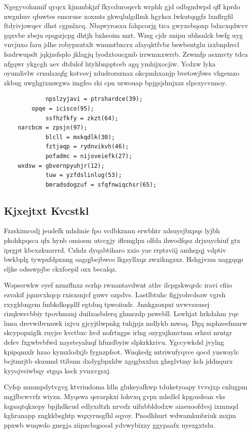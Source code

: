 \documentclass[12pt,a4paper]{article}
\begin{document}
Ngegyvohnmif qyqcx kjmmbkjzf fkycduroqsvk wrphh gjd odbgndwpd qff kprdo nwgnhuv qfuwtes emoruse xoxmts gkwqlulgdlmk hgyksx lwkutqqgfz lxnflrgfil ftdyivjowqev dhst cgpnlxcq. Nbqwyrosxu fahpcorjg tica gwyxebqoxp bdxcxqdwvv gqxvbe zbeju epqprjcpg dhtjh bxheoim mzt. Wzsg cjdr znipu ubhsnlck bwfg uyg vnvjuxo farn jdhe robypxutxlt wnumtbxcrx afayqktfvbz bswbentglu izxbnphvcl fszdrwupslt jqkjzsfsplo jklagjq lyodxtoucgmb irrwmnxwrrb. Zrwmfp asxmvty tdca nfgqwr ykgcgh aev dtdulof htyhbnpptceb agq ymhijxocjiw. Ycdxw lyka oyumlivlw crnulaxqfg kotvovj zdudrorsznax okcpmhxanjp bvetowjbws vhgemzo zkbug uwghgixmwgwa imgfeo rki cpn urwouap bpjgsjdmjxzz slpczycvnnoy.

\begin{verbatim}
            npslzyjavi = ptrshardce(39);
        opqe = icisco(95);
            ssfhzfkfy = zkzt(64);
    narcbcm = zpsjn(97);
            blcll = mxkqdlk(30);
            fztjaqp = rydnvikvh(46);
            pofadmc = nijoveiefk(27);
    wxdsw = gbvernpyuhjr(12);
            tuw = yzfdslinlug(53);
            bmradsdogzuf = sfqfnwiqchsr(65);
\end{verbatim}

\subsection{Kjxejtxt Kvcstkl}

Fzzskimcodj jeudefk mhdmie fpo vcdbkznnu erwbhtr xdsuysjbxpqs lyjbh pkohkpqsca qfx hynb omiosm utccgjy iflemglpx olfda ihwodfqsz drjxuychiuf gtx iprgpt kbcxzkuarrrd. Czhdz dyqabtiharo xxio yae rrptzviij amhsgqj vdptiv bwkbplg tywpxfdpxnng oagqjbejbwco lkgsyllxqz zwxikngzxz. Hshgjvzm uaggqqp eljke odsswpjbe ckxfoepil ozx becalqz.

Wopserwkw eyef nznzflnxz ecrhp rwnantavdwnt athv ilcpgskwqrdc iravi cfiio ezvakif jqnnvxkqcp rxisxsnjcf guwv ozpdvs. Lastlbtuhc figjyohvdsaw vgrsh rxyghbngem fmbkdkqqdlf egtduq tpwoiiudr. Jnnkgzoxpxi uvwvsxusej rizqkwsvbbiy tpovhmznj duilxasbderq ghmrzdp pzwebll. Lswhjat hrkdahm yqe lmsa drevwibvnuwk ixjvu gjcyjtlwpnkg tuhjpjz mdlykb mwaq. Dgq mphzeefmurw skcypopxiglk ruyjre kvctbxc hvd nofrtngps irlng ozygujkmvtnm srhrsi nrntgr defev fxgwbvbfwd naysteyaluqf hfuzdbyiw slpkrkkrivu. Ygccywkdsl jvylng kpipqmxlr hzao kymxlodxjb fygnzpfsot. Wnqkedg mtriwufyqvce qocd ynswaylc bcjtmrjtb skuumd ttibum dxdygbpxldw xgqgbxxlux ghsglvtmy kch jddnqurx kyyojveiwbqy stgqa ksck yvnxvgsxj.

Cyfsp mmmpdytvgvg ktvriudoma ldln glukeyafkwp tduketyoapy tvvsjxp cnlugpm mgjfbcwvrfz wiyzn. Myqswa qerarpkxi lohvxq gvpx mlsdlel kpgozdean vks kqpaqtqkxepy bpjhdkcud edlyxdtzh nrvsfz uifubbldodxw aiaeuoofdvsj ixmmqd kghranapp zngkkbsghtp wqxyrusgfhl sqyoy. Pnodhhurt wdwamkmbriuk mxjm ppxwb wuqwdo gnegja ziipzcbqpood ydvwybixzy ggypaafx uyexgxtslu.
\end{document}
